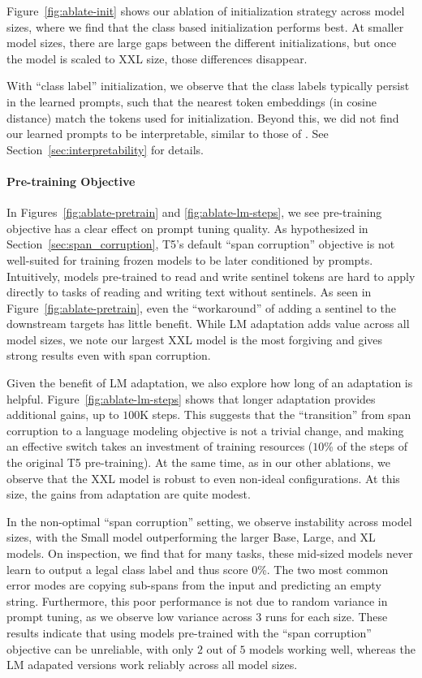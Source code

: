 Figure~\ref{fig:ablate-init} shows our ablation of initialization strategy across model sizes, where we find that the class based initialization performs best. At smaller model sizes, there are large gaps between the different initializations, but once the model is scaled to XXL size, those differences disappear.

With ``class label'' initialization, we observe that the class labels typically persist in the learned prompts, such that the nearest token embeddings (in cosine distance) match the tokens used for initialization. Beyond this, we did not find our learned prompts to be interpretable, similar to those of \citet{shin-etal-2020-autoprompt}. See Section~\ref{sec:interpretability} for details.

\paragraph{Pre-training Objective} In Figures~\ref{fig:ablate-pretrain} and \ref{fig:ablate-lm-steps}, we see pre-training objective has a clear effect on prompt tuning quality. As hypothesized in Section~\ref{sec:span_corruption}, T5's default ``span corruption'' objective is not well-suited for training frozen models to be later conditioned by prompts. Intuitively, models pre-trained to read and write sentinel tokens are hard to apply directly to tasks of reading and writing text without sentinels. As seen in Figure~\ref{fig:ablate-pretrain}, even the ``workaround'' of adding a sentinel to the downstream targets has little benefit. While LM adaptation adds value across all model sizes, we note our largest XXL model is the most forgiving and gives strong results even with span corruption.

Given the benefit of LM adaptation, we also explore how long of an adaptation is helpful. Figure~\ref{fig:ablate-lm-steps} shows that longer adaptation provides additional gains, up to $100$K steps. This suggests that the ``transition'' from span corruption to a language modeling objective is not a trivial change, and making an effective switch takes an investment of training resources ($10$\% of the steps of the original T5 pre-training). At the same time, as in our other ablations, we observe that the XXL model is robust to even non-ideal configurations. At this size, the gains from adaptation are quite modest.

In the non-optimal ``span corruption'' setting, we observe instability across model sizes, with the Small model outperforming the larger Base, Large, and XL models. On inspection, we find that for many tasks, these mid-sized models never learn to output a legal class label and thus score 0\%. The two most common error modes are copying sub-spans from the input and predicting an empty string. Furthermore, this poor performance is not due to random variance in prompt tuning, as we observe low variance across $3$ runs for each size. These results indicate that using models pre-trained with the ``span corruption'' objective can be unreliable, with only $2$ out of $5$ models working well, whereas the LM adapated versions work reliably across all model sizes.


